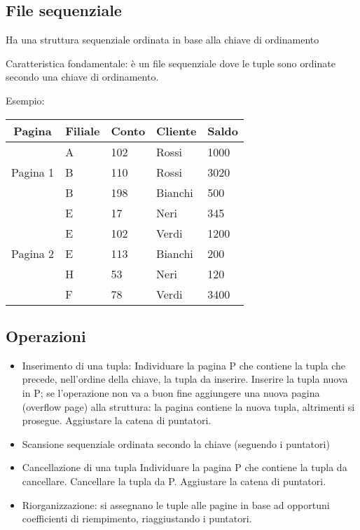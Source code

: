 \documentclass[a4paper, 10pt]{article}
\theoremstyle{definition}
\begin{document}
		\subsection*{File sequenziale}
		 Ha una struttura sequenziale ordinata in base alla chiave di ordinamento

		Caratteristica fondamentale: è un file sequenziale dove le
		tuple sono ordinate secondo una chiave di ordinamento.
	
		Esempio:
		\begin{center}
			\begin{tabular}{cllll}
				Pagina & Filiale & Conto & Cliente & Saldo \\
				\midrule
				&	A & 102 & Rossi & 1000 \\
				Pagina 1  & B & 110 & Rossi & 3020 \\
				& B & 198 & Bianchi & 500 \\
				\midrule
				& E & 17 & Neri & 345 \\
				& E & 102 & Verdi & 1200 \\
				Pagina 2  & E & 113 & Bianchi & 200 \\
				& H & 53 & Neri & 120 \\
				& F & 78 & Verdi & 3400
			\end{tabular}
		\end{center}
		
		\subsection*{Operazioni}
		\begin{itemize}
			\item Inserimento di una tupla:
				\subitem{-} Individuare la pagina P che contiene la tupla che precede, nell'ordine
				della chiave, la tupla da inserire.
				\subitem{-} Inserire la tupla nuova in P; se l'operazione non va a buon fine
				aggiungere una nuova pagina (overflow page) alla struttura: la pagina
				contiene la nuova tupla, altrimenti si prosegue.
				\subitem{-} Aggiustare la catena di puntatori.
			\item Scansione sequenziale ordinata secondo la chiave (seguendo i puntatori)
			\item Cancellazione di una tupla
				\subitem{-} Individuare la pagina P che contiene la tupla da cancellare.
				\subitem{-} Cancellare la tupla da P.
				\subitem{-} Aggiustare la catena di puntatori.
			\item Riorganizzazione: si assegnano le tuple alle pagine in base ad opportuni
			coefficienti di riempimento, riaggiustando i puntatori.
		\end{itemize}
		
\end{document}
